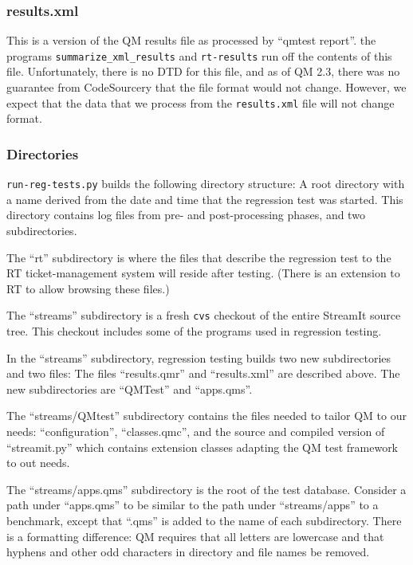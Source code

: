 \documentclass[11pt]{article}
\begin{document}
\subsubsection{results.xml}
This is a version of the QM results file as processed by ``qmtest report''.
the programs {\tt summarize\_xml\_results} and {\tt rt-results} run off
the contents of this file.
Unfortunately, there is no DTD for this file, and as of QM 2.3, there
was no guarantee from CodeSourcery that the file format would not
change.
However, we expect that the data that we process from the {\tt results.xml}
file will not change format.

\subsubsection{Directories}
{\tt run-reg-tests.py} builds the following directory structure:
A root directory with a name derived from the date and time that the
regression test was started.
This directory contains log files from pre- and post-processing
phases, and two subdirectories.

The ``rt'' subdirectory is where the files that describe the
regression test to the RT ticket-management system will reside after
testing. (There is an extension to RT to allow browsing these files.)

The ``streams'' subdirectory is a fresh {\tt cvs} checkout of the
entire StreamIt source tree.  This checkout includes some of the
programs used in regression testing.

In the ``streams'' subdirectory, regression testing builds two new
subdirectories and two files:  The files ``results.qmr'' and
``results.xml'' are described above.
The new subdirectories are ``QMTest'' and ``apps.qms''.

The ``streams/QMtest'' subdirectory contains the files needed to
tailor QM to our needs:  ``configuration'', ``classes.qmc'', and the
source and compiled version of ``streamit.py'' which contains extension
classes adapting the QM test framework to out needs.

The ``streams/apps.qms'' subdirectory is the root of the test
database.  Consider a path under ``apps.qms'' to be similar to the
path under ``streams/apps'' to a benchmark, except that ``.qms'' is
added to the name of each subdirectory.  There is a formatting
difference: QM requires that all letters are lowercase and that
hyphens and other odd characters in directory and file names be
removed.
\end{document}
